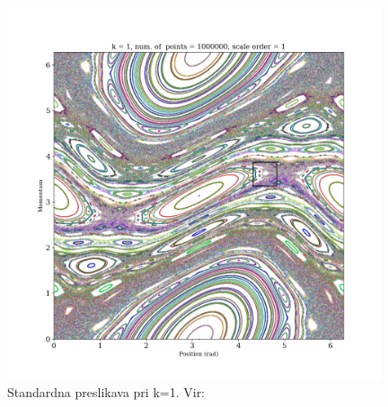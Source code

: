 \documentclass[]{article}
\begin{document}
\begin{figure}[!htb]
	\begin{center}
		\includegraphics[width = 11cm]{stdmap1}
		\caption{Standardna preslikava pri k=1. Vir: \cite{1}}
		\label{slika 6}
	\end{center}
\end{figure}
\end{document}
